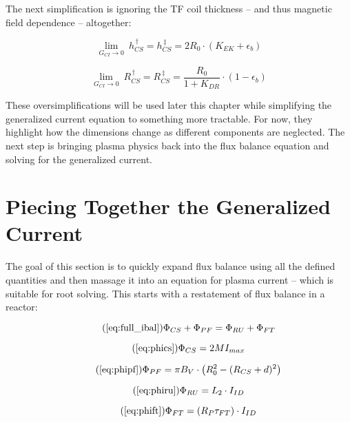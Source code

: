 The next simplification is ignoring the TF coil thickness -- and thus magnetic field dependence -- altogether:

\begin{equation}
	\label{eq:hcs_simple}
	\underset{G_{CI} \to 0}{\lim} \ h_{CS}^{\,\dagger} = h_{CS}^{\,\ddagger} = 2 R_0 \cdot \left( K_{EK} + \epsilon_b \right) 
\end{equation}

\begin{equation}
	\label{eq:rcs_simple}
	\underset{G_{CI} \to 0}{\lim} \ R_{CS}^{\,\dagger} = R_{CS}^{\,\ddagger} = \frac{ R_0 }{ 1 + K_{DR} } \cdot \left( 1 - \epsilon_b  \right)
\end{equation}

These oversimplifications will be used later this chapter while simplifying the generalized current equation to something more tractable. For now, they highlight how the dimensions change as different components are neglected. The next step is bringing plasma physics back into the flux balance equation and solving for the generalized current.

\section{Piecing Together the Generalized Current}

The goal of this section is to quickly expand flux balance using all the defined quantities and then massage it into an equation for plasma current -- which is suitable for root solving. This starts with a restatement of flux balance in a reactor:

\begin{equation}
	\tag{\ref{eq:full_ibal}}
	\Phi_{CS} + \Phi_{PF} = \Phi_{RU} + \Phi_{FT}
\end{equation}

\begin{equation}
	\tag{\ref{eq:phics}}
	\Phi_{CS} = 2 M I_{max}
\end{equation}

\begin{equation}
	\tag{\ref{eq:phipf}}
	\Phi_{PF} = \pi B_V \cdot \left( R_0^2 - ( R_{CS} + d ) ^ 2 \right)
\end{equation}

\begin{equation}
	\tag{\ref{eq:phiru}}
	\Phi_{RU} = L_2 \cdot I_{ID}
\end{equation}

\begin{equation}
	\tag{\ref{eq:phift}}
	\Phi_{FT} = ( R_P \tau_{FT} ) \cdot I_{ID}
\end{equation}

